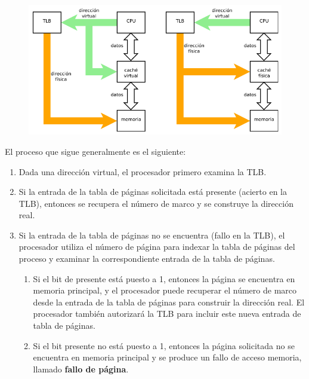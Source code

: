 \documentclass{article}
\begin{document}
\begin{figure}[h]
\centering
\includegraphics[scale=1,width=\textwidth]{direccionamientocache.png}
\end{figure}

El proceso que sigue generalmente es el siguiente:
\begin{enumerate}
\item Dada una dirección virtual, el procesador primero examina la TLB.

\item Si la entrada de la tabla de páginas solicitada está presente (acierto en la TLB), entonces se recupera el número de marco y se construye la dirección real.

\item Si la entrada de la tabla de páginas no se encuentra (fallo en la TLB), el procesador utiliza el número de página para indexar la tabla de páginas del proceso y examinar la correspondiente entrada de la tabla de páginas.
	
	\begin{enumerate}
	\item Si el bit de presente está puesto a 1, entonces la página se encuentra en memoria principal, y el procesador puede recuperar el número de marco desde la entrada de la tabla de páginas para construir la dirección real. El procesador también autorizará la TLB para incluir este nueva entrada de tabla de páginas.
	
	\item Si el bit presente no está puesto a 1, entonces la página solicitada no se encuentra en memoria principal y se produce un fallo de acceso memoria, llamado \textbf{fallo de página}.
	\end{enumerate}
\end{enumerate}
\end{document}
